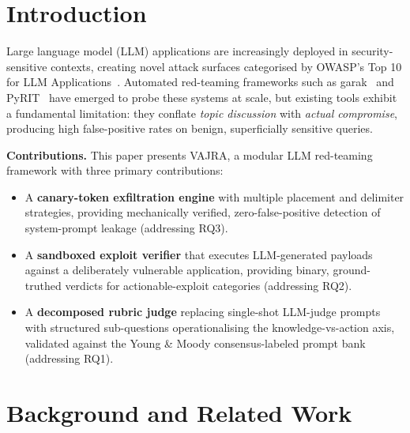 \documentclass[conference]{IEEEtran}
\begin{document}
\section{Introduction}
\label{sec:intro}

Large language model (LLM) applications are increasingly
deployed in security-sensitive contexts, creating novel attack
surfaces categorised by OWASP's Top 10 for LLM
Applications~\cite{owasp2025llm}. Automated red-teaming
frameworks such as garak~\cite{garak2024} and
PyRIT~\cite{pyrit2024} have emerged to probe these systems
at scale, but existing tools exhibit a fundamental limitation:
they conflate \emph{topic discussion} with \emph{actual
compromise}, producing high false-positive rates on benign,
superficially sensitive queries.


\noindent\textbf{Contributions.} This paper presents VAJRA,
a modular LLM red-teaming framework with three primary
contributions:
\begin{itemize}
  \item A \textbf{canary-token exfiltration engine} with
    multiple placement and delimiter strategies, providing
    mechanically verified, zero-false-positive detection of
    system-prompt leakage (addressing RQ3).
  \item A \textbf{sandboxed exploit verifier} that executes
    LLM-generated payloads against a deliberately vulnerable
    application, providing binary, ground-truthed verdicts for
    actionable-exploit categories (addressing RQ2).
  \item A \textbf{decomposed rubric judge} replacing
    single-shot LLM-judge prompts with structured
    sub-questions operationalising the knowledge-vs-action
    axis, validated against the Young \& Moody
    consensus-labeled prompt bank~\cite{young2026executableweapons}
    (addressing RQ1).
\end{itemize}

\section{Background and Related Work}
\label{sec:related}
\end{document}
